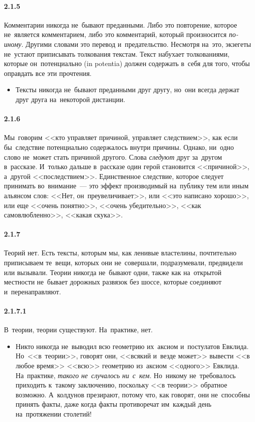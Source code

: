 \paragraph{2.1.5}\hypertarget{par:2.1.5}{} Комментарии никогда не~бывают преданными. Либо это повторение, которое не~является комментарием, либо это комментарий, который произносится {\itshape по-иному}. Другими словами это перевод и~предательство. Несмотря на~это, экзегеты не~устают приписывать толкования текстам. Текст набухает толкованиями, которые он~потенциально (in potentia) должен содержать в~себя для того, чтобы оправдать все эти прочтения. 
	\begin{itemize}
	\item 
	Тексты никогда не~бывают преданными друг другу, но~они всегда держат друг друга на~некоторой дистанции.
	\end{itemize}

\paragraph{2.1.6}\hypertarget{par:2.1.6}{} Мы~говорим <<кто управляет причиной, управляет следствием>>, как если бы~следствие потенциально содержалось внутри причины. Однако, ни~одно слово не~может стать причиной другого. Слова {\itshape следуют} друг за~другом в~рассказе. И~только дальше в~рассказе один герой становится <<причиной>>, а~другой <<последствием>>. Единственное следствие, которое следует принимать во~внимание~--- это эффект производимый на~публику тем или иным альянсом слов: <<Нет, он~преувеличивает>>, или <<это написано хорошо>>, или еще <<очень понятно>>, <<очень убедительно>>, <<как самовлюбленно>>, <<какая скука>>.

\paragraph{2.1.7}\hypertarget{par:2.1.7}{} Теорий нет. Есть тексты, которым мы, как ленивые властелины, почтительно приписываем те~вещи, которых они не~совершали, подразумевали, предвидели или вызывали. Теории никогда не~бывают одни, также как на~открытой местности не~бывает дорожных развязок без шоссе, которые соединяют и~перенаправляют.

\paragraph{2.1.7.1}\hypertarget{par:2.1.7.1}{} В~теории, теории существуют. На~практике, нет. 
	\begin{itemize}
	\item 
	Никто никогда не~выводил всю геометрию их~аксиом и~постулатов Евклида. Но~<<в~теории>>, говорят они, <<всякий и~везде может>> вывести <<в любое время>> <<всю>> геометрию из~аксиом <<одного>> Евклида. На~практике, {\itshape такого не~случалось ни~с~кем}. Но~никому не~требовалось приходить к~такому заключению, поскольку <<в теории>> обратное возможно. А~колдунов презирают, потому что, как говорят, они не~способны принять факты, даже когда факты противоречат им~каждый день на~протяжении столетий!
	\end{itemize}

